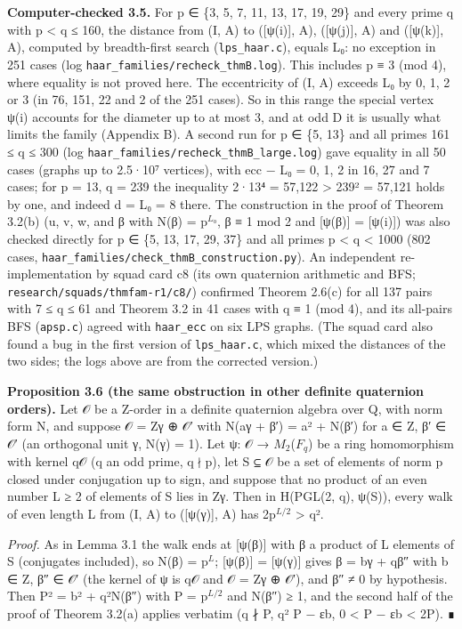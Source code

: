 \documentclass[
  10pt,
]{article}
\begin{document}
\textbf{Computer-checked 3.5.} For p ∈ \{3, 5, 7, 11, 13, 17, 19, 29\}
and every prime q with p \textless{} q ≤ 160, the distance from (I, A)
to ({[}ψ(i){]}, A), ({[}ψ(j){]}, A) and ({[}ψ(k){]}, A), computed by
breadth-first search (\texttt{lps\_haar.c}), equals L₀: no exception in
251 cases (log \texttt{haar\_families/recheck\_thmB.log}). This includes
p ≡ 3 (mod 4), where equality is not proved here. The eccentricity of
(I, A) exceeds L₀ by 0, 1, 2 or 3 (in 76, 151, 22 and 2 of the 251
cases). So in this range the special vertex ψ(i) accounts for the
diameter up to at most 3, and at odd D it is usually what limits the
family (Appendix B). A second run for p ∈ \{5, 13\} and all primes 161 ≤
q ≤ 300 (log \texttt{haar\_families/recheck\_thmB\_large.log}) gave
equality in all 50 cases (graphs up to 2.5·10⁷ vertices), with ecc − L₀
= 0, 1, 2 in 16, 27 and 7 cases; for p = 13, q = 239 the inequality
2·13⁴ = 57,122 \textgreater{} 239² = 57,121 holds by one, and indeed d =
L₀ = 8 there. The construction in the proof of Theorem 3.2(b) (u, v, w,
and β with N(β) = p\(^{L₀}\), β ≡ 1 mod 2 and {[}ψ(β){]} = {[}ψ(i){]})
was also checked directly for p ∈ \{5, 13, 17, 29, 37\} and all primes p
\textless{} q \textless{} 1000 (802 cases,
\texttt{haar\_families/check\_thmB\_construction.py}). An independent
re-implementation by squad card c8 (its own quaternion arithmetic and
BFS; \texttt{research/squads/thmfam-r1/c8/}) confirmed Theorem 2.6(c)
for all 137 pairs with 7 ≤ q ≤ 61 and Theorem 3.2 in 41 cases with q ≡ 1
(mod 4), and its all-pairs BFS (\texttt{apsp.c}) agreed with
\texttt{haar\_ecc} on six LPS graphs. (The squad card also found a bug
in the first version of \texttt{lps\_haar.c}, which mixed the distances
of the two sides; the logs above are from the corrected version.)

\textbf{Proposition 3.6 (the same obstruction in other definite
quaternion orders).} Let 𝒪 be a Z-order in a definite quaternion algebra
over Q, with norm form N, and suppose 𝒪 = Zγ ⊕ 𝒪′ with N(aγ + β′) = a² +
N(β′) for a ∈ Z, β′ ∈ 𝒪′ (an orthogonal unit γ, N(γ) = 1). Let ψ: 𝒪 →
\(M_{2}\)(\(F_{q}\)) be a ring homomorphism with kernel q𝒪 (q an odd
prime, q ∤ p), let S ⊆ 𝒪 be a set of elements of norm p closed under
conjugation up to sign, and suppose that no product of an even number L
≥ 2 of elements of S lies in Zγ. Then in H(PGL(2, q), ψ(S)), every walk
of even length L from (I, A) to ({[}ψ(γ){]}, A) has 2p\(^{L/2}\)
\textgreater{} q².

\emph{Proof.} As in Lemma 3.1 the walk ends at {[}ψ(β){]} with β a
product of L elements of S (conjugates included), so N(β) = p\(^{L}\);
{[}ψ(β){]} = {[}ψ(γ){]} gives β = bγ + qβ″ with b ∈ Z, β″ ∈ 𝒪′ (the
kernel of ψ is q𝒪 and 𝒪 = Zγ ⊕ 𝒪′), and β″ ≠ 0 by hypothesis. Then P² =
b² + q²N(β″) with P = p\(^{L/2}\) and N(β″) ≥ 1, and the second half of
the proof of Theorem 3.2(a) applies verbatim (q ∤ P, q² \textbar{} P −
εb, 0 \textless{} P − εb \textless{} 2P). ∎
\end{document}

